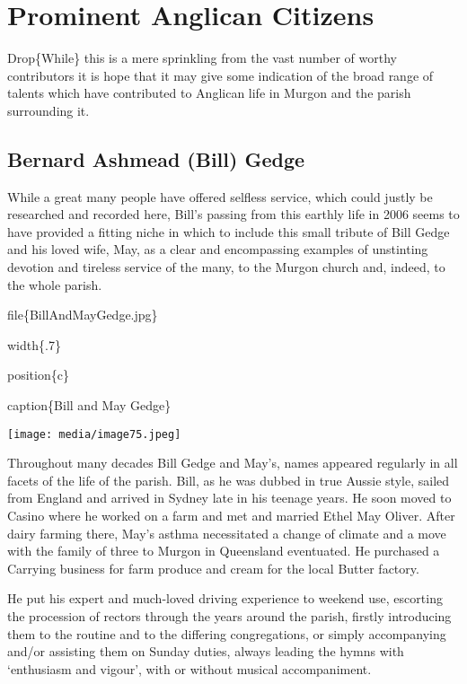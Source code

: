 \hypertarget{prominent-anglican-citizens}{%
\chapter{Prominent Anglican Citizens}\label{prominent-anglican-citizens}}

Drop\{While\} this is a mere sprinkling from the vast number of worthy contributors it is hope that it may give some indication of the broad range of talents which have contributed to Anglican life in Murgon and the parish surrounding it.

\hypertarget{bernard-ashmead-bill-gedge}{%
\section{Bernard Ashmead (Bill) Gedge}\label{bernard-ashmead-bill-gedge}}

While a great many people have offered selfless service, which could justly be researched and recorded here, Bill's passing from this earthly life in 2006 seems to have provided a fitting niche in which to include this small tribute of Bill Gedge and his loved wife, May, as a clear and encompassing examples of unstinting devotion and tireless service of the many, to the Murgon church and, indeed, to the whole parish.

file\{BillAndMayGedge.jpg\}

width\{.7\}

position\{c\}

caption\{Bill and May Gedge\}

\texttt{[image: media/image75.jpeg]}

Throughout many decades Bill Gedge and May's, names appeared regularly in all facets of the life of the parish. Bill, as he was dubbed in true Aussie style, sailed from England and arrived in Sydney late in his teenage years. He soon moved to Casino where he worked on a farm and met and married Ethel May Oliver. After dairy farming there, May's asthma necessitated a change of climate and a move with the family of three to Murgon in Queensland eventuated. He purchased a Carrying business for farm produce and cream for the local Butter factory.

He put his expert and much-loved driving experience to weekend use, escorting the procession of rectors through the years around the parish, firstly introducing them to the routine and to the differing congregations, or simply accompanying and/or assisting them on Sunday duties, always leading the hymns with `enthusiasm and vigour', with or without musical accompaniment.

